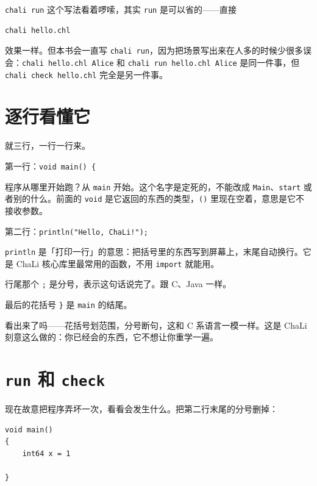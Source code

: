\texttt{chali run} 这个写法看着啰嗦，其实 \texttt{run} 是可以省的——直接

\par
\medskip
\begin{lstlisting}[style=sh]
chali hello.chl
\end{lstlisting}
\par
\medskip

效果一样。但本书会一直写 \texttt{chali run}，因为把场景写出来在人多的时候少很多误会：\texttt{chali hello.\allowbreak{}chl Alice} 和 \texttt{chali run hello.\allowbreak{}chl Alice} 是同一件事，但 \texttt{chali check hello.\allowbreak{}chl} 完全是另一件事。

\section{逐行看懂它}

就三行，一行一行来。

第一行：\texttt{void main(\allowbreak{})\allowbreak{} \{}

程序从哪里开始跑？从 \texttt{main} 开始。这个名字是定死的，不能改成 \texttt{Main}、\texttt{start} 或者别的什么。前面的 \texttt{void} 是它返回的东西的类型，\texttt{(\allowbreak{})\allowbreak{}} 里现在空着，意思是它不接收参数。

第二行：\texttt{println(\allowbreak{}"Hello,\allowbreak{} Cha\allowbreak{}Li!")\allowbreak{};}

\texttt{println} 是「打印一行」的意思：把括号里的东西写到屏幕上，末尾自动换行。它是 ChaLi 核心库里最常用的函数，不用 \texttt{import} 就能用。

行尾那个 \texttt{;} 是分号，表示这句话说完了。跟 C、Java 一样。

最后的花括号 \texttt{\}} 是 \texttt{main} 的结尾。

看出来了吗——花括号划范围，分号断句，这和 C 系语言一模一样。这是 ChaLi 刻意这么做的：你已经会的东西，它不想让你重学一遍。

\section{\texttt{run} 和 \texttt{check}}

现在故意把程序弄坏一次，看看会发生什么。把第二行末尾的分号删掉：

\par
\medskip
\begin{lstlisting}[style=chali]
void main()
{
    int64 x = 1

}
\end{lstlisting}
\par
\medskip

